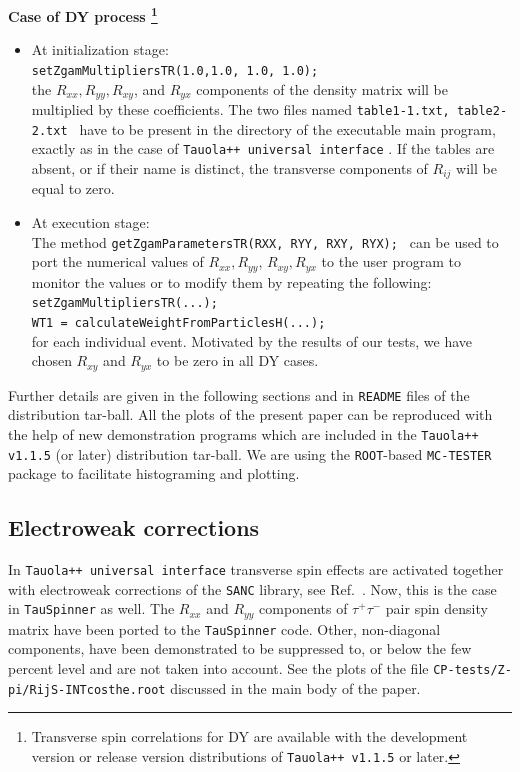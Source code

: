 \documentclass[12pt]{article}
\begin{document}
{ \bf Case of DY process%
    \footnote{Transverse spin correlations for DY are  available  with the development 
    version or release version 
    distributions of {\tt Tauola++ v1.1.5} or later.}}
\begin{itemize}
\item
At initialization stage: \\
    {\tt setZgamMultipliersTR(1.0,1.0, 1.0, 1.0);} \\
    the $R_{xx}, R_{yy}, R_{xy} $, and $R_{yx} $ components of the 
    density matrix will be multiplied by these coefficients. 
    The two files named {\tt  table1-1.txt, table2-2.txt }  
    have to be present in the directory  of the executable main 
    program, exactly as in the case of {\tt Tauola++ universal interface} \cite{Davidson:2010rw}.
    If the  tables are absent, or if their name is distinct, 
    the transverse components of $R_{ij}$ will be equal to zero.    
\item
At execution stage: \\
The method {\tt getZgamParametersTR(RXX, RYY, RXY, RYX);  } 
can be used to port the numerical values of 
$R_{xx}, R_{yy}$, $R_{xy}, R_{yx}$ to the user program  to monitor the values or to modify them
by repeating the following: \\
{\tt setZgamMultipliersTR(...);} \\
{\tt WT1 = calculateWeightFromParticlesH(...);} \\ 
for each individual event.
Motivated by the results of our tests,  
we have chosen  $R_{xy}$ and $R_{yx}$  to be zero in all DY
cases.
\end{itemize}




Further details are given in the following sections and in {\tt README} files of the distribution tar-ball.
All the plots of the present paper can be reproduced with the help of new demonstration programs 
which are included in the {\tt Tauola++ v1.1.5} (or later) distribution tar-ball.
We are using the {\tt ROOT}-based {\tt MC-TESTER} package \cite{Davidson:2008ma} to facilitate histograming and plotting.

\subsection{Electroweak corrections}
\label{sec:transverse-spin-effects}
In  {\tt Tauola++ universal interface} transverse spin effects   are activated 
together with electroweak corrections of the {\tt SANC} library, see Ref.~\cite{Andonov:2008ga}. Now, this is the case in {\tt TauSpinner} as well.
The  $R_{xx}$ and $ R_{yy}$ components of $\tau^+ \tau^-$ pair spin density matrix have been
ported to the {\tt TauSpinner} code. Other, non-diagonal  
components, have been demonstrated to be suppressed to, or below the few 
percent level and are not taken into account. See the plots of the  file
{\tt CP-tests/Z-pi/RijS-INTcosthe.root} discussed in the main body of the paper.
\end{document}
